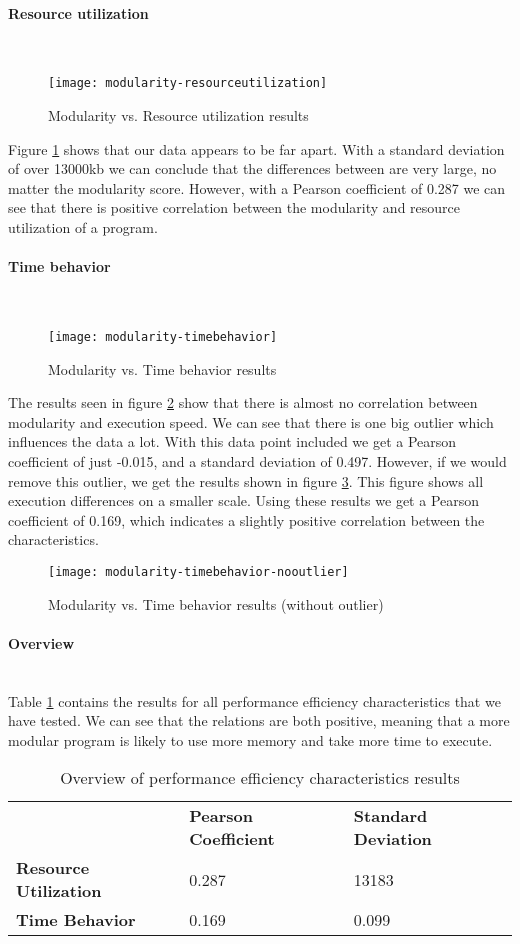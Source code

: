 \documentclass[twoside]{uva-inf-bachelor-thesis}
\newcommand{\myparagraph}[1]{\paragraph{#1}\mbox{}\\}
\begin{document}
\myparagraph{Resource utilization}
\begin{figure}[H]
    \label{figure:perf-res}
    \caption{Modularity vs. Resource utilization results}
    \centering
        \texttt{[image: modularity-resourceutilization]}
\end{figure}

Figure \ref{figure:perf-res} shows that our data appears to be far apart. With a standard deviation of over 13000kb we can conclude that the differences between are very large, no matter the modularity score. However, with a Pearson coefficient of 0.287 we can see that there is positive correlation between the modularity and resource utilization of a program.

\myparagraph{Time behavior}
\begin{figure}[H]
    \label{figure:perf-time}
    \caption{Modularity vs. Time behavior results}
    \centering
        \texttt{[image: modularity-timebehavior]}
\end{figure}

The results seen in figure \ref{figure:perf-time} show that there is almost no correlation between modularity and execution speed. We can see that there is one big outlier which influences the data a lot. With this data point included we get a Pearson coefficient of just -0.015, and a standard deviation of 0.497. However, if we would remove this outlier, we get the results shown in figure \ref{figure:perf-time-no}. This figure shows all execution differences on a smaller scale. Using these results we get a Pearson coefficient of 0.169, which indicates a slightly positive correlation between the characteristics.

\begin{figure}[H]
    \label{figure:perf-time-no}
    \caption{Modularity vs. Time behavior results (without outlier)}
    \centering
        \texttt{[image: modularity-timebehavior-nooutlier]}
\end{figure}

\myparagraph{Overview}
Table \ref{table:perf-overview} contains the results for all performance efficiency characteristics that we have tested. We can see that the relations are both positive, meaning that a more modular program is likely to use more memory and take more time to execute.

\begin{table}[H]
\centering
\caption{Overview of performance efficiency characteristics results}
\label{table:perf-overview}
\begin{tabular}{lll}
                              & \textbf{Pearson Coefficient} & \textbf{Standard Deviation} \\
\textbf{Resource Utilization} & 0.287                        & 13183                       \\
\textbf{Time Behavior}        & 0.169                        & 0.099                      
\end{tabular}
\end{table}
\end{document}
